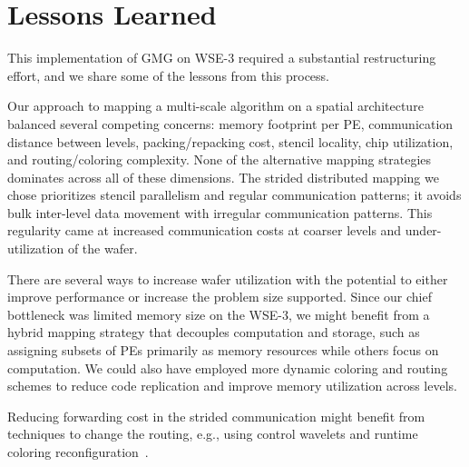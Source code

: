 \documentclass[conference]{IEEEtran}
\begin{document}
    \section{Lessons Learned}
    This implementation of GMG on WSE-3 required a substantial restructuring effort, and we share some of the lessons from this process.  

 Our approach to mapping a multi-scale algorithm on a spatial architecture balanced    
several competing concerns: memory footprint per PE, communication distance between levels, packing/repacking cost, stencil locality, chip utilization, and routing/coloring complexity. None of the alternative mapping strategies dominates across all of these dimensions. 
The strided distributed mapping we chose prioritizes stencil parallelism and regular communication patterns; it avoids bulk inter-level data movement with irregular communication patterns.  This regularity came at increased communication costs at coarser levels and under-utilization of the wafer.  

There are several ways to increase wafer utilization with the potential to either improve performance or increase the problem size supported. Since our chief bottleneck was limited memory size on the WSE-3, we might benefit from a 
hybrid mapping strategy that decouples computation and storage, such as assigning subsets of PEs primarily as memory resources while others focus on computation.  We could also have employed more dynamic coloring and routing schemes to reduce code replication and improve memory utilization across levels.  

        
Reducing forwarding cost in the strided communication might benefit from techniques to change the routing, e.g., using control wavelets and runtime coloring reconfiguration~\cite{mathias}.


\end{document}
